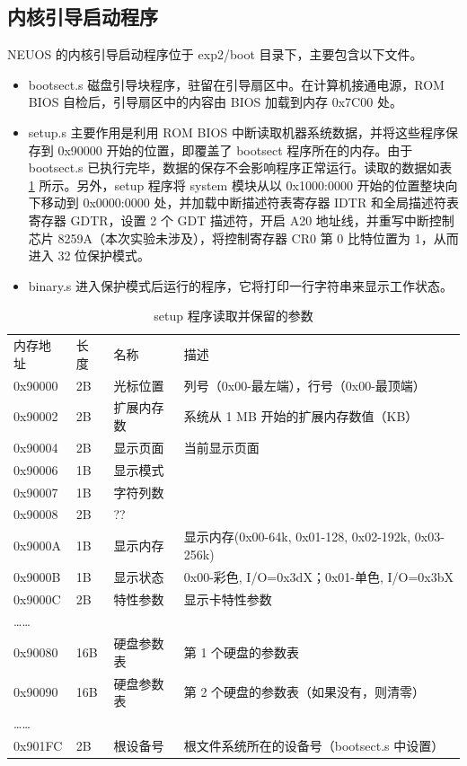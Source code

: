 \subsection{内核引导启动程序}

NEUOS 的内核引导启动程序位于 exp2/boot 目录下，主要包含以下文件。

\begin{itemize}
    \item bootsect.s 磁盘引导块程序，驻留在引导扇区中。在计算机接通电源，ROM BIOS 自检后，引导扇区中的内容由 BIOS 加载到内存 0x7C00 处。
    \item setup.s 主要作用是利用 ROM BIOS 中断读取机器系统数据，并将这些程序保存到 0x90000 开始的位置，即覆盖了 bootsect 程序所在的内存。由于 bootsect.s 已执行完毕，数据的保存不会影响程序正常运行。读取的数据如表 \ref{tab:setup程序读取并保留的参数} 所示。另外，setup 程序将 system 模块从以 0x1000:0000 开始的位置整块向下移动到 0x0000:0000 处，并加载中断描述符表寄存器 IDTR 和全局描述符表寄存器 GDTR，设置 2 个 GDT 描述符，开启 A20 地址线，并重写中断控制芯片 8259A（本次实验未涉及），将控制寄存器 CR0 第 0 比特位置为 1，从而进入 32 位保护模式。 
    \item binary.s 进入保护模式后运行的程序，它将打印一行字符串来显示工作状态。
\end{itemize}

\begin{table}[]
\caption{setup 程序读取并保留的参数}
\label{tab:setup程序读取并保留的参数}
\begin{tabular}{llll}
内存地址 & 长度 & 名称 & 描述 \\
0x90000 & 2B & 光标位置 & 列号（0x00-最左端），行号（0x00-最顶端） \\
0x90002 & 2B & 扩展内存数 & 系统从 1 MB 开始的扩展内存数值（KB） \\
0x90004 & 2B & 显示页面 & 当前显示页面 \\
0x90006 & 1B & 显示模式 &  \\
0x90007 & 1B & 字符列数 &  \\
0x90008 & 2B & ?? &  \\
0x9000A & 1B & 显示内存 & 显示内存(0x00-64k, 0x01-128, 0x02-192k, 0x03-256k) \\
0x9000B & 1B & 显示状态 & 0x00-彩色, I/O=0x3dX；0x01-单色, I/O=0x3bX \\
0x9000C & 2B & 特性参数 & 显示卡特性参数 \\
…… &  &  &  \\
0x90080 & 16B & 硬盘参数表 & 第 1 个硬盘的参数表 \\
0x90090 & 16B & 硬盘参数表 & 第 2 个硬盘的参数表（如果没有，则清零） \\
…… &  &  &  \\
0x901FC & 2B & 根设备号 & 根文件系统所在的设备号（bootsect.s 中设置）
\end{tabular}
\end{table}

